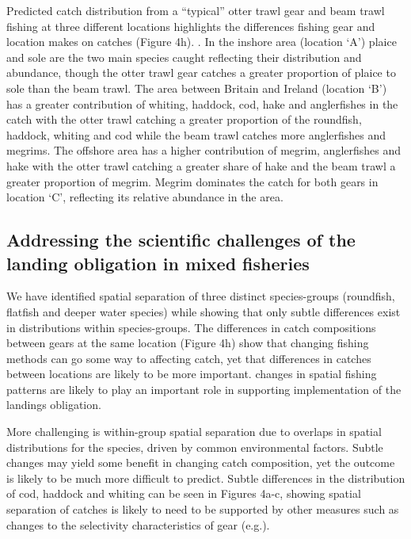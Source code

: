 \documentclass{nature}
\begin{document}
\begin{linenumbers}
Predicted catch distribution from a ``typical'' otter trawl gear and beam trawl
fishing at three different locations highlights the differences fishing gear
and location makes on catches (Figure 4h). . In the inshore area (location `A') plaice and
sole are the two main species  caught reflecting their distribution
and abundance, though the otter trawl gear catches a greater proportion of
plaice to sole than the beam trawl.  The area between Britain and Ireland
(location `B') has a greater contribution of whiting, haddock, cod, hake and
anglerfishes in the catch with the otter trawl catching a greater proportion of
the roundfish, haddock, whiting and cod while the beam trawl catches more
anglerfishes and megrims. The offshore area has a higher contribution of
megrim, anglerfishes and hake with the otter trawl catching a greater share of
hake and the beam trawl a greater proportion of megrim. Megrim dominates the
catch for both gears in location `C', reflecting its relative abundance in the
area.  

\subsection{Addressing the scientific challenges of the landing obligation in
	mixed fisheries}  We have
identified spatial separation of three distinct species-groups (roundfish,
flatfish and deeper water species) while showing that only subtle differences
exist in distributions within species-groups. The differences in catch
compositions between gears at the same location (Figure 4h) show that changing
fishing methods can go some way to affecting catch, yet that differences in
catches between locations are likely to be more important. 
 changes in spatial fishing patterns are likely to
play an important role in supporting implementation of the landings obligation.

More challenging is within-group spatial separation due to
 overlaps in spatial distributions for the species, driven
by common environmental factors. Subtle changes may yield some benefit in
changing catch composition, yet the outcome is likely to be much more difficult
to predict.  Subtle differences in the distribution of
cod, haddock and whiting can be seen in Figures 4a-c, showing spatial
separation of catches is 
likely to need to be supported by other measures such as changes to the
selectivity characteristics of gear (e.g.\cite{Santos2016}). 


\end{linenumbers}
\end{document}

